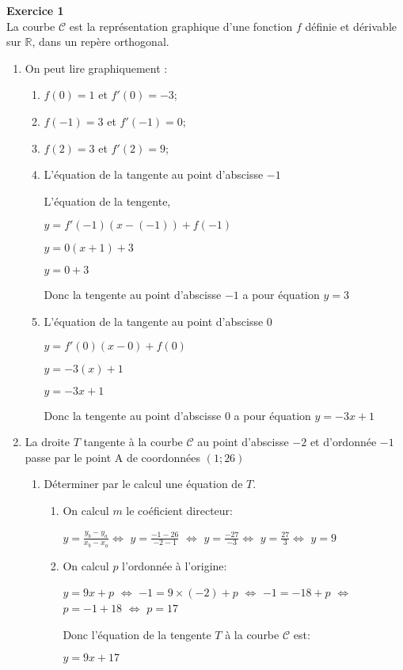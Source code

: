 \documentclass[12pt,a4paper]{article}
\def\R{{\mathbb R}}
\theoremstyle{break}
\begin{document}
\begin{center}
   \shadowbox{\begin{large}
      \textcolor{black}{DM de Mathématiques}
   \end{large}}
\end{center}
\textbf{Exercice 1}\\
La courbe $\mathscr{C}$ est la représentation graphique d’une fonction $f$ définie et dérivable sur $\R$, dans un repère orthogonal.
\begin{enumerate}
	\item On peut lire graphiquement :
	\begin{enumerate}
		\item $f(0) = 1$ et $f'(0) = -3$;
		\item $f(-1) = 3$ et $f'(-1) = 0$;
		\item $f(2) = 3$ et $f'(2) = 9$;
		\item L’équation de la tangente au point d’abscisse $-1$\par
		L'équation de la tengente,\par
		$y = f'(-1)(x-(-1))+f(-1)$\par
		$y = 0(x+1)+3$\par
		$y = 0+3$\par
		Donc la tengente au point d'abscisse $-1$ a pour équation $y = 3$

		\item L’équation de la tangente au point d’abscisse $0$\par
		$y = f'(0)(x-0)+f(0)$\par
		$y = -3(x)+1$\par
		$y = -3x+1$\par
		Donc la tengente au point d'abscisse $0$ a pour équation $y = -3x+1$
			\end{enumerate}
		\item La droite $T$ tangente à la courbe $\mathscr{C}$ au point d’abscisse $-2$ et d’ordonnée $-1$ passe par le point A de coordonnées  $(1; 26)$
		\begin{enumerate}
			\item Déterminer par le calcul une équation de $T$.
		\begin{enumerate}
			\item On calcul $m$ le coéficient directeur:\par
			$y = \frac{y_b-y_a}{x_b-x_a}\Leftrightarrow$
			$y = \frac{-1-26}{-2-1}$ $\Leftrightarrow$
			$y = \frac{-27}{-3}\Leftrightarrow$
			$y = \frac{27}{3}\Leftrightarrow$
			$y = 9$\par
			\item On calcul $p$ l'ordonnée à l'origine:\par
			$y = 9x +p$ $\Leftrightarrow$
			$-1 = 9\times (-2) +p$ $\Leftrightarrow$
			$-1 = -18+p$ $\Leftrightarrow$
			$p = -1+18$ $\Leftrightarrow$
			$p = 17$\par
			Donc l'équation de la tengente $T$ à la courbe $\mathscr{C}$ est: \par
			$y = 9x+17$



\end{enumerate}
\end{enumerate}
\end{enumerate}
\end{document}
